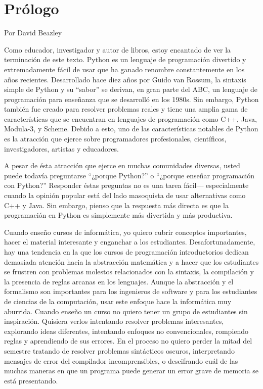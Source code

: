 
\chapter{Prólogo}

Por David Beazley

Como educador, investigador y autor de libros, estoy encantado de
ver la terminación de este texto. Python es un lenguaje de programación
divertido y extremadamente fácil de usar que ha ganado renombre constantemente
en los años recientes. Desarrollado hace diez años por Guido van Rossum,
la sintaxis simple de Python y su ``sabor'' se derivan, en gran
parte del ABC, un lenguaje de programación para enseñanza que se desarrolló
en los 1980s. Sin embargo, Python también fue creado para resolver
problemas reales y tiene una amplia gama de características que se
encuentran en lenguajes de programación como C++, Java, Modula-3,
y Scheme. Debido a esto, uno de las características notables de Python
es la atracción que ejerce sobre programadores profesionales, científicos,
investigadores, artistas y educadores.

A pesar de ésta atracción que ejerce en muchas comunidades diversas,
usted puede todavía preguntarse ``¿porque Python?'' o ``¿porque
enseñar programación con Python?'' Responder éstas preguntas no es
una tarea fácil— especialmente cuando la opinión popular está del
lado masoquista de usar alternativas como C++ y Java. Sin embargo,
pienso que la respuesta más directa es que la programación en Python
es simplemente más divertida y más productiva.

Cuando enseño cursos de informática, yo quiero cubrir conceptos importantes,
hacer el material interesante y enganchar a los estudiantes. Desafortunadamente,
hay una tendencia en la que los cursos de programación introductorios
dedican demasiada atención hacia la abstracción matemática y a hacer
que los estudiantes se frustren con problemas molestos relacionados
con la sintaxis, la compilación y la presencia de reglas arcanas en
los lenguajes. Aunque la abstracción y el formalismo son importantes
para los ingenieros de software y para los estudiantes de ciencias
de la computación, usar este enfoque hace la informática muy aburrida.
Cuando enseño un curso no quiero tener un grupo de estudiantes sin
inspiración. Quisiera verlos intentando resolver problemas interesantes,
explorando ideas diferentes, intentando enfoques no convencionales,
rompiendo reglas y aprendiendo de sus errores. En el proceso no quiero
perder la mitad del semestre tratando de resolver problemas sintácticos
oscuros, interpretando mensajes de error del compilador incomprensibles,
o descifrando cuál de las muchas maneras en que un programa puede
generar un error grave de memoria se está presentando.


